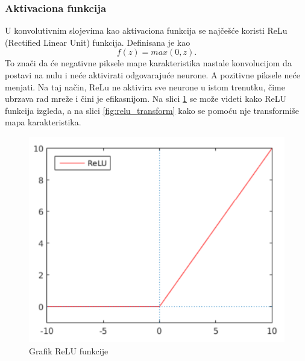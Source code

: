 \documentclass[a4paper]{article}
\begin{document}
\subsubsection{Aktivaciona funkcija}
\label{aktivaciona_funkcija}

U konvolutivnim slojevima kao aktivaciona funkcija se najčešće koristi ReLu (Rectified Linear Unit) funkcija. Definisana je kao $$ f(z) = max(0, z). $$ To znači da će negativne piksele mape karakteristika nastale konvolucijom da postavi na nulu i neće aktivirati odgovarajuće neurone. A pozitivne piksele neće menjati. Na taj način, ReLu ne aktivira sve neurone u istom trenutku, čime ubrzava rad mreže i čini je efikasnijom. Na slici \ref{fig:relu_fja} se može videti kako ReLU funkcija izgleda, a na slici \ref{fig:relu_transform} kako se pomoću nje transformiše mapa karakteristika.

\begin{figure}[h!]
\begin{center}
\includegraphics[scale=0.6]{relu_graph.png}
\end{center}
\caption{Grafik ReLU funkcije}
\label{fig:relu_fja}
\end{figure}


\end{document}
